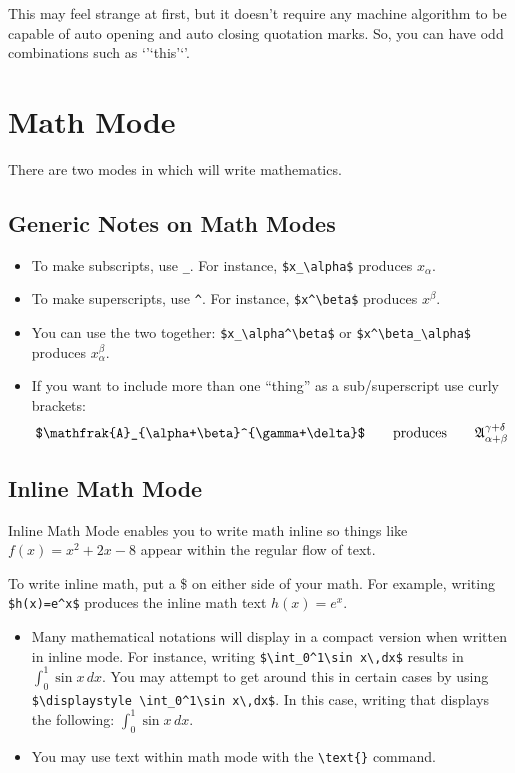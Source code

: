 \documentclass[letterpaper,twoside,10pt]{article}
\begin{document}
\bigbreak This may feel strange at first, but it doesn't require any machine algorithm to be capable
of auto opening and auto closing quotation marks. So, you can have odd combinations such as
`'`this'`'.














\newpage
\section{Math Mode}

There are two modes in which \LaTeXe will write mathematics.

\subsection{Generic Notes on Math Modes}

\begin{itemize}
\item To make subscripts, use \verb!_!. For instance, \verb!$x_\alpha$! produces $x_\alpha$.
\item To make superscripts, use \verb!^!. For instance, \verb!$x^\beta$! produces $x^\beta$.
\item You can use the two together: \verb!$x_\alpha^\beta$! or \verb!$x^\beta_\alpha$! produces $x^\beta_\alpha$.
\item If you want to include more than one ``thing'' as a sub/superscript use curly brackets:
\[
\verb!$\mathfrak{A}_{\alpha+\beta}^{\gamma+\delta}$!\qquad\text{produces}\qquad \displaystyle\mathfrak{A}_{\alpha+\beta}^{\gamma+\delta}
\]

\end{itemize}


\subsection{Inline Math Mode}

Inline Math Mode enables you to write math inline so things like $f(x)=x^2+2x-8$ appear within the
regular flow of text.

\bigbreak To write inline math, put a \$ on either side of your math. For example, writing
{\verb!$h(x)=e^x$!} produces the inline math text $h(x)=e^x$.

\begin{itemize}
\item Many mathematical notations will display in a compact version when written in inline mode. For
instance, writing \verb!$\int_0^1\sin x\,dx$! results in $\int_0^1\sin x\,dx$. You may attempt to
get around this in certain cases by using \verb!$\displaystyle \int_0^1\sin x\,dx$!. In this case,
writing that displays the following: $\displaystyle \int_0^1\sin x\,dx$.
\item You may use text within math mode with the \verb!\text{}! command.
\end{itemize}
\end{document}
